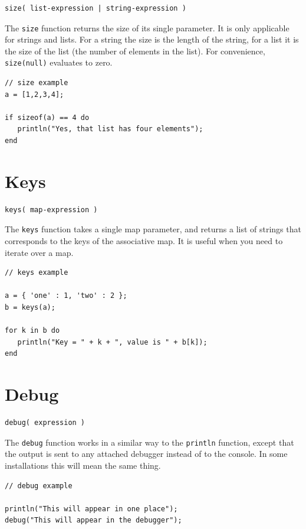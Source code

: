 \begin{verbatim}
size( list-expression | string-expression )
\end{verbatim}

The \verb+size+ function returns the size of its single parameter. It is only applicable for strings and lists. For a string the size is the length of the string, for a list it is the size of the list (the number of elements in the list). For convenience, \verb+size(null)+ evaluates to zero.

\begin{lstlisting}[caption={Size example}]
// size example
a = [1,2,3,4];

if sizeof(a) == 4 do
   println("Yes, that list has four elements");
end

\end{lstlisting}
\section{Keys}

\begin{verbatim}
keys( map-expression )
\end{verbatim}

The \verb+keys+ function takes a single map parameter, and returns a list of strings that corresponds to the keys of the associative map. It is useful when you need to iterate over a map.

\begin{lstlisting}[caption={Keys example}]
// keys example

a = { 'one' : 1, 'two' : 2 };
b = keys(a);

for k in b do
   println("Key = " + k + ", value is " + b[k]);
end

\end{lstlisting}

\section{Debug}

\begin{verbatim}
debug( expression )
\end{verbatim}

The \verb+debug+ function works in a similar way to the \verb+println+ function, except that the output is sent to any attached debugger instead of to the console. In some \Reflex installations this will mean the same thing.

\begin{lstlisting}[caption={Debug example}]
// debug example

println("This will appear in one place");
debug("This will appear in the debugger");

\end{lstlisting}

